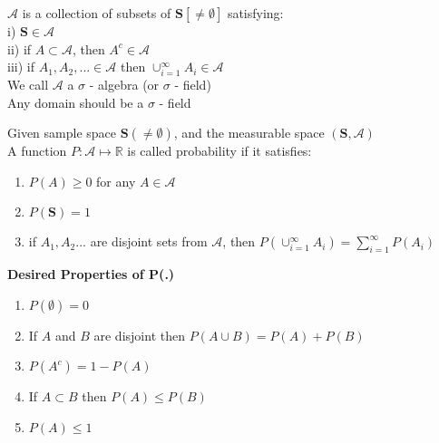\documentclass[14pt, oneside, letterpaper]{notes}
\begin{document}

%
%

\begin{mydef}
	$\mathscr{A}$ is a collection of subsets of $\textbf{S}[\neq \emptyset]$
	satisfying: \\
	\indent i) $\textbf{S} \in \mathscr{A}$ \\
	\indent ii) if $ A \subset \mathscr{A}$, then $A^c \in \mathscr{A}$ \\
	\indent iii) if $A_1, A_2, ... \in \mathscr{A}$ then 
	$\cup_{i=1}^{\infty} A_i \in \mathscr{A} $ \\
	We call $\mathscr{A}$ a $\sigma$ - algebra (or $\sigma$ - field) \\
	Any domain should be a $\sigma$ - field
\end{mydef}

\begin{mydef}
	Given sample space $\textbf{S} (\neq \emptyset)$, and the 
	measurable space $(\textbf{S}, \mathscr{A})$ \\
	A function $P: \mathscr{A} \mapsto \mathbb{R}$ is called 
	probability if it satisfies:
	\begin{enumerate}
		\item $P(A) \geq 0$ for any $A \in \mathscr{A}$
		\item $P(\textbf{S}) = 1$
		\item if $A_1, A_2 ...$ are disjoint sets from $\mathscr{A}$,
		then $P(\cup_{i=1}^{\infty} A_i) = \sum_{i=1}^{\infty} P(A_i)$
	\end{enumerate}
\end{mydef}

\begin{remark}
\textbf{Desired Properties of P(.)}
\begin{enumerate}
	\item $P(\emptyset) = 0$
	\item If $A$ and $B$ are disjoint then $P(A \cup B) = P(A) + P(B)$
	\item $P(A^c) = 1- P(A)$
	\item If $A \subset B$ then $P(A) \leq P(B)$
	\item $P(A) \leq 1$
\end{enumerate}
\end{remark}
\end{document}
